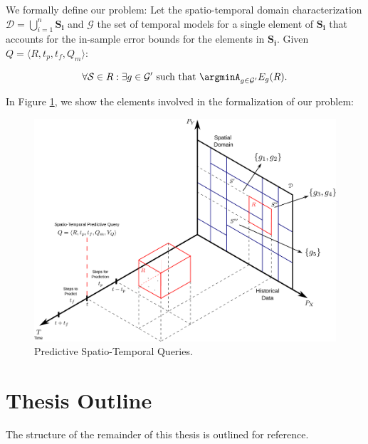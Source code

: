 
We formally define our problem: Let the spatio-temporal domain characterization $\mathcal{D} = \bigcup_{i=1}^{n} \mathbf{S_i}$ and $\mathcal{G}$ the set of temporal models for a single element of $\mathbf{S_i}$ that accounts for the in-sample error bounds for the elements in $\mathbf{S_i}$. Given $Q = \langle R, t_{p}, t_{f}, Q_{m} \rangle$:

\begin{equation}
\forall \mathcal{S} \in R: \exists g \in \mathcal{G'} \,\,\textrm{such that} \,\, \argminA_{g\in\mathcal{G'}} E_{g}(R).
\end{equation}

\noindent In Figure \ref{fig:time-series}, we show the elements involved in the formalization of our problem:
\begin{figure}[htb]
	\centering
	\includegraphics[scale=0.25]{../Figures/RepresentationTimeSeries}
	\caption{Predictive Spatio-Temporal Queries.}
	\label{fig:time-series}
\end{figure}


\section{Thesis Outline}
\label{Sec:ThesisOutline}

The structure of the remainder of this thesis is outlined for reference.

